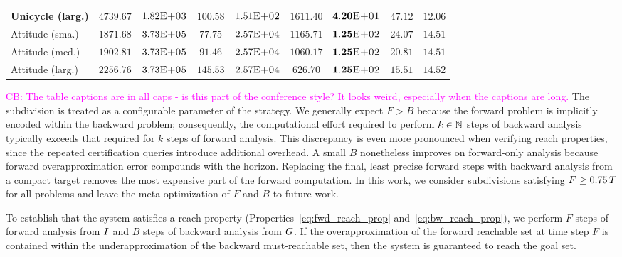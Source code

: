 \documentclass[letterpaper, 10 pt, conference]{ieeeconf}  %
\newcommand{\cb}[1]{\noindent\textcolor{magenta}{\newline CB: #1}}
\newcommand{\cb}[1]{}
\begin{document}
\begin{table}[h!]
{\begin{tabular}{lcccccc|cc}
        Unicycle (larg.) & $4739.67$ & $1.82\textsc{E+03}$ & $\mathbf{100.58}$ & $1.51\textsc{E+02}$ & $1611.40$ & $\mathbf{4.20}\textsc{E+01}$ & $47.12$ & $12.06$ \\
        \midrule
        Attitude (sma.)  & $1871.68$ & $3.73\textsc{E+05}$ & $\mathbf{77.75}$ & $2.57\textsc{E+04}$ & $1165.71$ & $\mathbf{1.25}\textsc{E+02}$ & $24.07$ & $14.51$ \\
        Attitude (med.)  & $1902.81$  & $3.73\textsc{E+05}$ & $\mathbf{91.46}$ & $2.57\textsc{E+04}$ & $1060.17$ & $\mathbf{1.25}\textsc{E+02}$ & $20.81$ & $14.51$ \\
        Attitude (larg.) & $2256.76$ & $3.73\textsc{E+05}$ & $\mathbf{145.53}$ & $2.57\textsc{E+04}$ & $626.70$ & $\mathbf{1.25}\textsc{E+02}$ & $15.51$ & $14.52$ \\
        \bottomrule
    \end{tabular}}
    \label{tab:results-outer}
\end{table}
\cb{The table captions are in all caps - is this part of the conference style?  It looks weird, especially when the captions are long.}
The subdivision is treated as a configurable parameter of the strategy. We generally expect $F > B$ because the forward problem is implicitly encoded within the backward problem; consequently, the computational effort required to perform $k \in \mathbb{N}$ steps of backward analysis typically exceeds that required for $k$ steps of forward analysis. This discrepancy is even more pronounced when verifying reach properties, since the repeated certification queries introduce additional overhead. A small $B$ nonetheless improves on forward-only analysis because forward overapproximation error compounds with the horizon. Replacing the final, least precise forward steps with backward analysis from a compact target removes the most expensive part of the forward computation.
In this work, we consider subdivisions satisfying $F \ge 0.75\,T$ for all problems and leave the meta-optimization of $F$ and $B$ to future work.

To establish that the system satisfies a reach property (Properties~\ref{eq:fwd_reach_prop} and~\ref{eq:bw_reach_prop}), we perform $F$ steps of forward analysis from $I$ and $B$ steps of backward analysis from $G$. 
If the overapproximation of the forward reachable set at time step $F$ is contained within the underapproximation of the backward must-reachable set, then the system is guaranteed to reach the goal set. 
\end{document}
